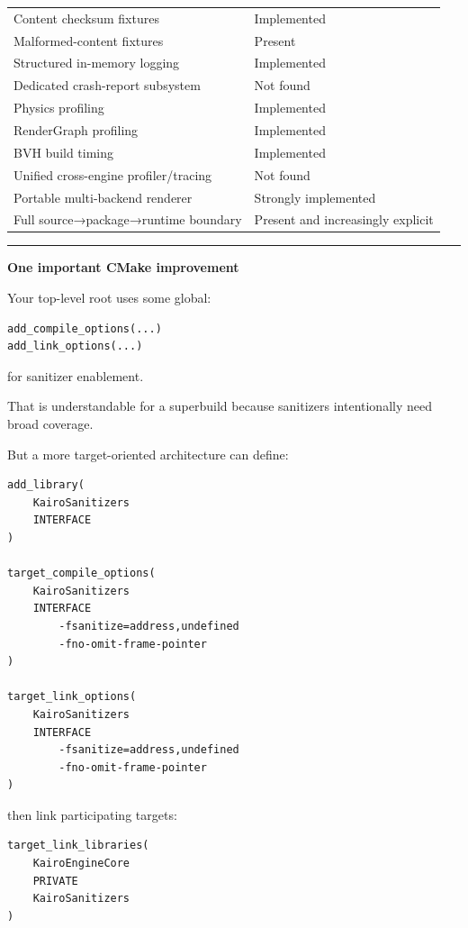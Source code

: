 {\begin{longtable}[]{@{}
  >{\raggedright\arraybackslash}p{}
  >{\raggedright\arraybackslash}p{}@{}}
Content checksum fixtures & Implemented \\
Malformed-content fixtures & Present \\
Structured in-memory logging & Implemented \\
Dedicated crash-report subsystem & Not found \\
Physics profiling & Implemented \\
RenderGraph profiling & Implemented \\
BVH build timing & Implemented \\
Unified cross-engine profiler/tracing & Not found \\
Portable multi-backend renderer & Strongly implemented \\
Full source→package→runtime boundary & Present and increasingly explicit \\
\end{longtable}
}

\begin{center}\rule{0.5\linewidth}{0.5pt}\end{center}

\textbf{One important CMake improvement}

Your top-level root uses some global:

\begin{verbatim}
add_compile_options(...)
add_link_options(...)
\end{verbatim}

for sanitizer enablement.

That is understandable for a superbuild because sanitizers intentionally need broad coverage.

But a more target-oriented architecture can define:

\begin{verbatim}
add_library(
    KairoSanitizers
    INTERFACE
)

target_compile_options(
    KairoSanitizers
    INTERFACE
        -fsanitize=address,undefined
        -fno-omit-frame-pointer
)

target_link_options(
    KairoSanitizers
    INTERFACE
        -fsanitize=address,undefined
        -fno-omit-frame-pointer
)
\end{verbatim}

then link participating targets:

\begin{verbatim}
target_link_libraries(
    KairoEngineCore
    PRIVATE
    KairoSanitizers
)
\end{verbatim}


